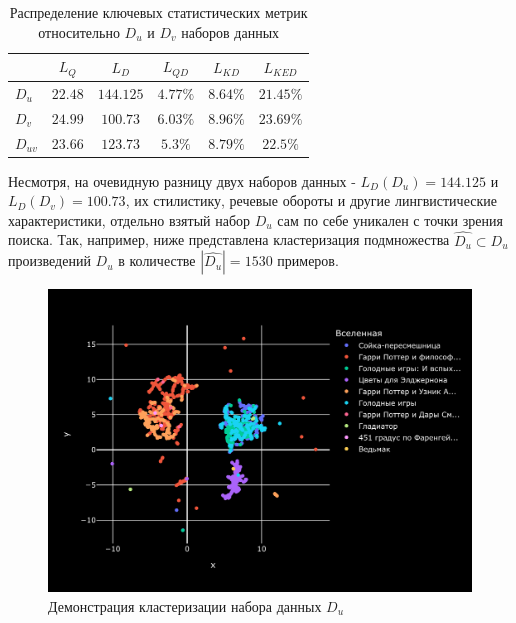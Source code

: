 \begin{table}[h]
    \centering
    \begin{tabular}{l|ccccc}
        \textbf{} & \textbf{$L_{Q}$} & \textbf{$L_{D}$} & \textbf{$L_{QD}$} & \textbf{$L_{KD}$} & \textbf{$L_{KED}$} \\
        \hline
        \textbf{$D_{u}$}  &$22.48$ &$144.125$  &$4.77\%$  &$8.64\%$  & $21.45\%$ \\
        \textbf{$D_{v}$}  &$24.99$  &$100.73$  &$6.03\%$  &$8.96\%$  & $23.69\%$ \\
        \textbf{$D_{uv}$} &$23.66$  &$123.73$  &$5.3\%$  &$8.79\%$  & $22.5\%$ \\
    \end{tabular}
    \caption{Распределение ключевых статистических метрик относительно $D_u$ и $D_v$ наборов данных}
    \label{tab:tokensdist}
\end{table}

Несмотря, на очевидную разницу двух наборов данных -  $L_D(D_u)=144.125$ и $L_D(D_v)=100.73$, их стилистику, речевые обороты и другие лингвистические характеристики, отдельно взятый набор $D_u$ сам по себе уникален с точки зрения поиска. 
Так, например, ниже представлена кластеризация подмножества $\hat{D_u} \subset D_u$ произведений $D_u$ в количестве $|\hat{D_u}|=1530$ примеров.

\begin{figure}[ht]
    \centering
    \includegraphics[width=\columnwidth]{figures/clustering_model=[e5]_dataset=[universe].png} %
    \caption{Демонстрация кластеризации набора данных $D_u$}
    \label{fig:clustering-e5-base-universe}
\end{figure}